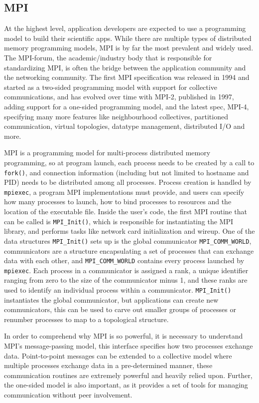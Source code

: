 \subsection{MPI}
At the highest level, application developers are expected to use a programming model to build their scientific apps. 
While there are multiple types of distributed memory programming models, MPI is by far the most prevalent and widely used.
The MPI-forum, the academic/industry body that is responsible for standardizing MPI, is often the bridge between the application community and the networking community.
The first MPI specification was released in 1994 and started as a two-sided programming model with support for collective communications, and has evolved over time with MPI-2, published in 1997, adding support for a one-sided programming model, and the latest spec, MPI-4, specifying many more features like neighbourhood collectives, partitioned communication, virtual topologies, datatype management, distributed I/O and more.

MPI is a programming model for multi-process distributed memory programming, so at program launch, each process needs to be created by a call to \texttt{fork()}, and connection information (including but not limited to hostname and PID) needs to be distributed among all processes. 
Process creation is handled by \texttt{mpiexec}, a program MPI implementations must provide, and users can specify how many processes to launch, how to bind processes to resources and the location of the executable file.
Inside the user's code, the first MPI routine that can be called is \texttt{MPI\_Init()}, which is responsible for instantiating the MPI library, and performs tasks like network card initialization and wireup.
One of the data structures \texttt{MPI\_Init()} sets up is the global communicator \texttt{MPI\_COMM\_WORLD}, communicators are a structure encapsulating a set of processes that can exchange data with each other, and \texttt{MPI\_COMM\_WORLD} contains every process launched by \texttt{mpiexec}.
Each process in a communicator is assigned a rank, a unique identifier ranging from zero to the size of the communicator minus 1, and these ranks are used to identify an individual process within a communicator.
\texttt{MPI\_Init()} instantiates the global communicator, but applications can create new communicators, this can be used to carve out smaller groups of processes or renumber processes to map to a topological structure.

In order to comprehend why MPI is so powerful, it is necessary to understand MPI's message-passing model, this interface specifies how two processes exchange data.
Point-to-point messages can be extended to a collective model where multiple processes exchange data in a pre-determined manner, these communication routines are extremely powerful and heavily relied upon. 
Further, the one-sided model is also important, as it provides a set of tools for managing communication without peer involvement.

